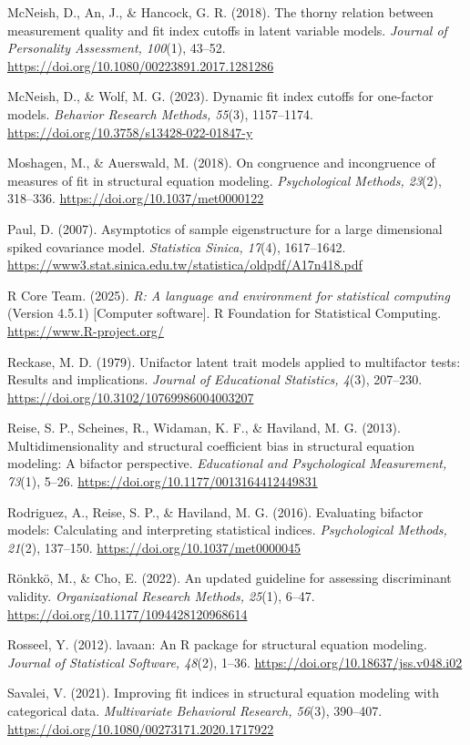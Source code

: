 McNeish, D., An, J., \& Hancock, G. R. (2018). The thorny relation between measurement quality and fit index cutoffs in latent variable models. \textit{Journal of Personality Assessment, 100}(1), 43--52. \url{https://doi.org/10.1080/00223891.2017.1281286}

McNeish, D., \& Wolf, M. G. (2023). Dynamic fit index cutoffs for one-factor models. \textit{Behavior Research Methods, 55}(3), 1157--1174. \url{https://doi.org/10.3758/s13428-022-01847-y}

Moshagen, M., \& Auerswald, M. (2018). On congruence and incongruence of measures of fit in structural equation modeling. \textit{Psychological Methods, 23}(2), 318--336. \url{https://doi.org/10.1037/met0000122}

Paul, D. (2007). Asymptotics of sample eigenstructure for a large dimensional spiked covariance model. \textit{Statistica Sinica, 17}(4), 1617--1642. \url{https://www3.stat.sinica.edu.tw/statistica/oldpdf/A17n418.pdf}

R Core Team. (2025). \textit{R: A language and environment for statistical computing} (Version 4.5.1) [Computer software]. R Foundation for Statistical Computing. \url{https://www.R-project.org/}

Reckase, M. D. (1979). Unifactor latent trait models applied to multifactor tests: Results and implications. \textit{Journal of Educational Statistics, 4}(3), 207--230. \url{https://doi.org/10.3102/10769986004003207}

Reise, S. P., Scheines, R., Widaman, K. F., \& Haviland, M. G. (2013). Multidimensionality and structural coefficient bias in structural equation modeling: A bifactor perspective. \textit{Educational and Psychological Measurement, 73}(1), 5--26. \url{https://doi.org/10.1177/0013164412449831}

Rodriguez, A., Reise, S. P., \& Haviland, M. G. (2016). Evaluating bifactor models: Calculating and interpreting statistical indices. \textit{Psychological Methods, 21}(2), 137--150. \url{https://doi.org/10.1037/met0000045}

Rönkkö, M., \& Cho, E. (2022). An updated guideline for assessing discriminant validity. \textit{Organizational Research Methods, 25}(1), 6--47. \url{https://doi.org/10.1177/1094428120968614}

Rosseel, Y. (2012). lavaan: An R package for structural equation modeling. \textit{Journal of Statistical Software, 48}(2), 1--36. \url{https://doi.org/10.18637/jss.v048.i02}

Savalei, V. (2021). Improving fit indices in structural equation modeling with categorical data. \textit{Multivariate Behavioral Research, 56}(3), 390--407. \url{https://doi.org/10.1080/00273171.2020.1717922}

